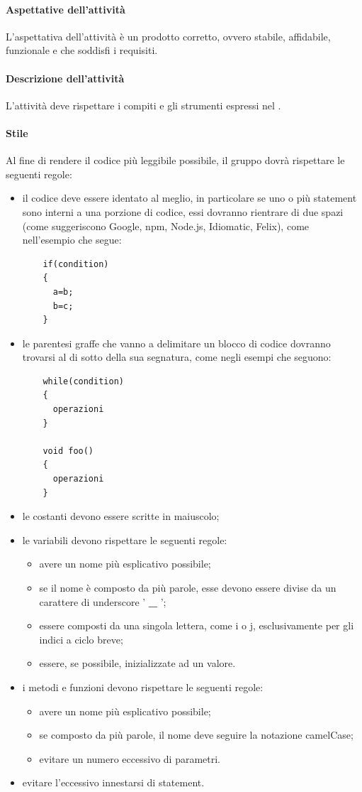  \paragraph{Aspettative dell'attività}
 L'aspettativa dell'attività è un prodotto corretto, ovvero stabile, affidabile, funzionale e che soddisfi i requisiti.
 \paragraph{Descrizione dell'attività}
 L'attività deve rispettare i compiti e gli strumenti espressi nel \PPdocRP.
 \paragraph{Stile}

 Al fine di rendere il codice più leggibile possibile, il gruppo dovrà rispettare le seguenti regole:
 \begin{itemize}
 	\item il codice deve essere identato al meglio, in particolare se uno o più statement sono interni a una porzione di codice, essi dovranno rientrare di due spazi (come suggeriscono Google, npm, Node.js, Idiomatic, Felix), come nell'esempio che segue: \begin{lstlisting}
 	if(condition)
 	{
 	  a=b;
 	  b=c;
 	}
 	\end{lstlisting}
 	\item le parentesi graffe che vanno a delimitare un blocco di codice dovranno trovarsi al di sotto della sua segnatura, come negli esempi che seguono:
 	\begin{lstlisting}
 	while(condition)
 	{
 	  operazioni
 	}

 	void foo()
 	{
      operazioni
 	}
 	\end{lstlisting}
 	\item le costanti devono essere scritte in maiuscolo;
 	\item le variabili devono rispettare le seguenti regole:
 	\begin{itemize}
 		\item avere un nome più esplicativo possibile;
 		\item se il nome è composto da più parole, esse devono essere divise da un carattere di underscore ' \textbf{\_} ';
 		\item essere composti da una singola lettera, come i o j, esclusivamente per gli indici a ciclo breve;
 		\item essere, se possibile, inizializzate ad un valore.
 	\end{itemize}
 	\item i metodi e funzioni devono rispettare le seguenti regole:
 	\begin{itemize}
 		\item avere un nome più esplicativo possibile;
 		\item se composto da più parole, il nome deve seguire la notazione camelCase;
 		\item evitare un numero eccessivo di parametri.
 	\end{itemize}
 	\item evitare l'eccessivo innestarsi di statement.
 \end{itemize}
